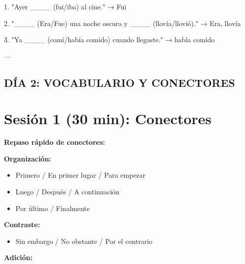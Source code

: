 \documentclass[a4paper,11pt]{article}
\begin{document}
1. "Ayer ____ (fui/iba) al cine." → Fui

2. "____ (Era/Fue) una noche oscura y ____ (llovía/llovió)." → Era, llovía

3. "Ya ____ (comí/había comido) cuando llegaste." → había comido

\vspace{0.2cm}

---

\vspace{0.2cm}

\subsection{DÍA 2: VOCABULARIO Y CONECTORES}

\vspace{0.2cm}

\section{Sesión 1 (30 min): Conectores}

\vspace{0.2cm}

\textbf{Repaso rápido de conectores:}

\vspace{0.2cm}

\textbf{Organización:}

\begin{itemize}

  \item Primero / En primer lugar / Para empezar

  \item Luego / Después / A continuación

  \item Por último / Finalmente

\end{itemize}

\vspace{0.2cm}

\textbf{Contraste:}

\begin{itemize}

  \item Sin embargo / No obstante / Por el contrario

\end{itemize}

\vspace{0.2cm}

\textbf{Adición:}
\end{document}
